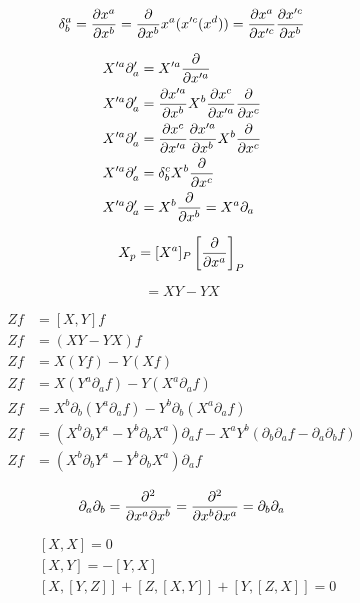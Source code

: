 \documentclass[../main]{subfiles}
\begin{document}
\begin{equation}
    \delta_b^a=\pdv{x^a}{x^b}=\pdv{}{x^b}x^a(x'^c(x^d))=\pdv{x^a}{x'^c} \pdv{x'^c}{x^b}
\end{equation}

\begin{align*}
    X'^a \partial'_a&=X'^a \pdv{}{x'^a} \\
    X'^a \partial'_a&= \pdv{x'^a}{x^b}X^b \pdv{x^c}{x'^a} \pdv{}{x^c} \\
    X'^a \partial'_a&=\pdv{x^c}{x'^a} \pdv{x'^a}{x^b}X^b \pdv{}{x^c} \\
    X'^a \partial'_a&=\delta_b^c X^b \pdv{}{x^c} \\
    X'^a \partial'_a&=X^b \pdv{}{x^b}=X^a \partial_a
\end{align*}

\begin{equation*}
    X_p=[X^a]_P \left[ \pdv{}{x^a} \right]_P
\end{equation*}

\begin{equation}
    [X, Y]=XY-YX
\end{equation}

\begin{align*}
    Zf&= [X, Y]f \\
    Zf&= (XY-YX)f \\
    Zf&= X(Yf)-Y(Xf) \\
    Zf&= X(Y^a \partial_a f)-Y(X^a \partial_a f) \\
    Zf&=X^b \partial_b (Y^a \partial_a f)-Y^b \partial_b (X^a \partial_a f) \\
    Zf&=(X^b \partial_b Y^a-Y^b \partial_b X^a)\partial_a f- X^a Y^b(\partial_b \partial_a f-\partial_a \partial_b f) \\
    Zf&=(X^b\partial_b Y^a-Y^b \partial_b X^a) \partial_a f
\end{align*}

\begin{equation*}
    \partial_a \partial_b=\pdv{^2}{x^a \partial x^b}=\pdv{^2}{x^b \partial x^a}= \partial_b \partial_a
\end{equation*}

\begin{align}
    &[X, X]=0 \\
    &[X, Y]=-[Y, X] \\
    &[X,[Y, Z]]+[Z, [X, Y]]+[Y, [Z,X]]=0
\end{align}

\newpage
\end{document}

